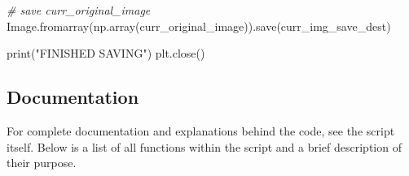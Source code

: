 \documentclass[
]{article}
\newenvironment{Shaded}{\begin{snugshade}}{\end{snugshade}}
\newcommand{\BuiltInTok}[1]{#1}
\newcommand{\CommentTok}[1]{\textcolor[rgb]{0.56,0.35,0.01}{\textit{#1}}}
\newcommand{\NormalTok}[1]{#1}
\newcommand{\StringTok}[1]{\textcolor[rgb]{0.31,0.60,0.02}{#1}}
\begin{document}
\begin{Shaded}
\begin{Highlighting}[]
            \CommentTok{\# save curr\_original\_image}
\NormalTok{            Image.fromarray(np.array(curr\_original\_image)).save(curr\_img\_save\_dest)}

    \BuiltInTok{print}\NormalTok{(}\StringTok{"FINISHED SAVING"}\NormalTok{)}
\NormalTok{    plt.close()}
\end{Highlighting}
\end{Shaded}

\hypertarget{documentation}{%
\subsection{Documentation}\label{documentation}}

For complete documentation and explanations behind the code, see the script itself.
Below is a list of all functions within the script and a brief description of their purpose.
\end{document}
